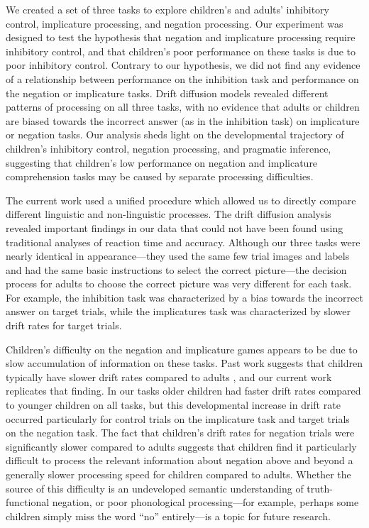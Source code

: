 \documentclass[10pt,letterpaper]{article}
\begin{document}
We created a set of three tasks to explore children's and adults' inhibitory control, implicature processing, and negation processing. Our experiment was designed to test the hypothesis that negation and implicature processing require inhibitory control, and that children's poor performance on these tasks is due to poor inhibitory control. Contrary to our hypothesis, we did not find any evidence of a relationship between performance on the inhibition task and performance on the negation or implicature tasks. Drift diffusion models revealed different patterns of processing on all three tasks, with no evidence that adults or children are biased towards the incorrect answer (as in the inhibition task) on implicature or negation tasks. Our analysis sheds light on the developmental trajectory of children's inhibitory control, negation processing, and pragmatic inference, suggesting that children's low performance on negation and implicature comprehension tasks may be caused by separate processing difficulties.

The current work used a unified procedure which allowed us to directly compare different linguistic and non-linguistic processes. The drift diffusion analysis revealed important findings in our data that could not have been found using traditional analyses of reaction time and accuracy. Although our three tasks were nearly identical in appearance---they used the same few trial images and labels and had the same basic instructions to select the correct picture---the decision process for adults to choose the correct picture was very different for each task. For example, the inhibition task was characterized by a bias towards the incorrect answer on target trials, while the implicatures task was characterized by slower drift rates for target trials.

Children's difficulty on the negation and implicature games appears to be due to slow accumulation of information on these tasks. Past work suggests that children typically have slower drift rates compared to adults \cite{ratcliff2012}, and our current work replicates that finding. In our tasks older children had faster drift rates compared to younger children on all tasks, but this developmental increase in drift rate occurred particularly for control trials on the implicature task and target trials on the negation task. The fact that children's drift rates for negation trials were significantly slower compared to adults suggests that children find it particularly difficult to process the relevant information about negation above and beyond a generally slower processing speed for children compared to adults. Whether the source of this difficulty is an undeveloped semantic understanding of truth-functional negation, or poor phonological processing---for example, perhaps some children simply miss the word ``no'' entirely---is a topic for future research.
\end{document}

